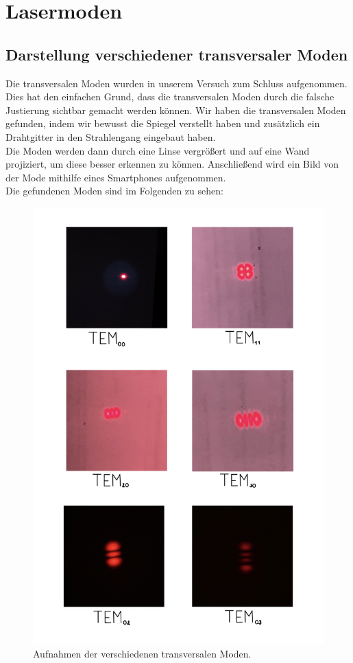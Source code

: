 \section{Lasermoden}
\subsection{Darstellung verschiedener transversaler Moden}
Die transversalen Moden wurden in unserem Versuch zum Schluss aufgenommen. Dies hat 
den einfachen Grund, dass die transversalen Moden durch die falsche Justierung sichtbar
gemacht werden können. Wir haben die transversalen Moden gefunden, indem 
wir bewusst die Spiegel verstellt haben und zusätzlich ein Drahtgitter in den Strahlengang eingebaut haben.\\ 
Die Moden werden dann durch 
eine Linse vergrößert und auf eine Wand projiziert, um diese besser erkennen zu können.
Anschließend wird ein Bild von der Mode mithilfe eines Smartphones aufgenommen. \\
Die gefundenen Moden sind im Folgenden zu sehen: 
\begin{figure}[h]
    \centering
    \includegraphics[scale=0.28]{Bilder/Auswertung Anna/TEM.jpg}
    \caption{Aufnahmen der verschiedenen transversalen Moden.}
   \end{figure}

